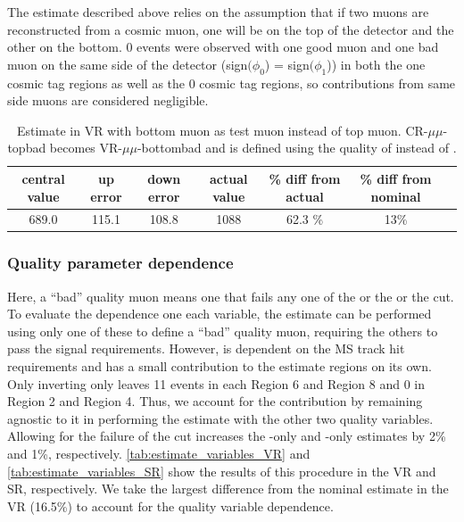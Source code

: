 The estimate described above relies on the assumption that if two muons are reconstructed from a cosmic muon, one will be on the top of the detector and the other on the bottom. 0 events were observed with one good muon and one bad muon on the same side of the detector (sign$(\phi_{0}$) = sign$(\phi_{1}$)) in both the one cosmic tag regions as well as the 0 cosmic tag regions, so contributions from same side muons are considered negligible.

\begin{table}
\centering
\small
\begin{tabular}{ccccccc}
central value  & up error & down error & actual value & \% diff from actual & \% diff from nominal\\
\hline
689.0  & 115.1 & 108.8 & 1088 & 62.3 \% & 13\% \\
\hline
\end{tabular}
\caption{Estimate in VR with bottom muon as test muon instead of top muon. CR-$\mu\mu$-topbad becomes VR-$\mu\mu$-bottombad and \rgood is defined using the quality of \mb instead of \mt.}
\label{tab:syst-orientation}
\end{table}


\subsubsection{Quality parameter dependence}

Here, a ``bad'' quality muon means one that fails any one of the \nprecision or the \nphi or the \chiCB cut. To evaluate the dependence one each variable, the estimate can be performed using only one of these to define a ``bad'' quality muon, requiring the others to pass the signal requirements. However, \chiCB is dependent on the MS track hit requirements and has a small contribution to the estimate regions on its own. Only inverting only \chiCB leaves 11 events in each Region 6 and Region 8 and 0 in Region 2 and Region 4. Thus, we account for the \chiCB contribution by remaining agnostic to it in performing the estimate with the other two quality variables.  Allowing for the failure of the \chiCB cut increases the \nprecision-only and \nphi-only estimates by 2\% and 1\%, respectively. \autoref{tab:estimate_variables_VR} and \autoref{tab:estimate_variables_SR} show the results of this procedure in the VR and SR, respectively. We take the largest difference from the nominal estimate in the VR (16.5\%) to account for the quality variable dependence. 

